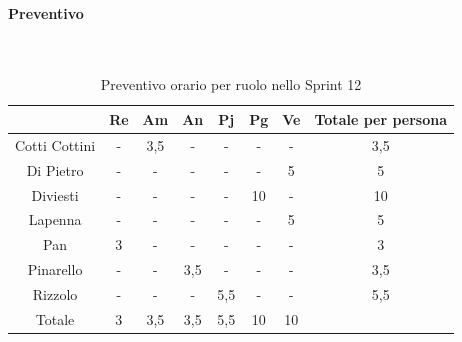 \documentclass{article}
\begin{document}
                \paragraph{Preventivo}\mbox{}\\
                \begin{table}[H]
                    \centering
                    \begin{tabular}{|c|c|c|c|c|c|c|c|}
                    \hline
                                  & Re  & Am  & An  & Pj  & Pg  & Ve  & Totale per persona \\ \hline
                    Cotti Cottini & -   & 3,5 & -   & -   & -   & -   & 3,5                \\ \hline
                    Di Pietro     & -   & -   & -   & -   & -   & 5   & 5                  \\ \hline
                    Diviesti      & -   & -   & -   & -   & 10  & -   & 10                 \\ \hline
                    Lapenna       & -   & -   & -   & -   & -   & 5   & 5                  \\ \hline
                    Pan           & 3   & -   & -   & -   & -   & -   & 3                  \\ \hline
                    Pinarello     & -   & -   & 3,5 & -   & -   & -   & 3,5                \\ \hline
                    Rizzolo       & -   & -   & -   & 5,5 & -   & -   & 5,5                \\ \hline
                    Totale        & 3   & 3,5 & 3,5 & 5,5 & 10  & 10  &                    \\ \hline
                    \end{tabular}
                    \caption{Preventivo orario per ruolo nello Sprint 12}
                \end{table}

\end{document}
